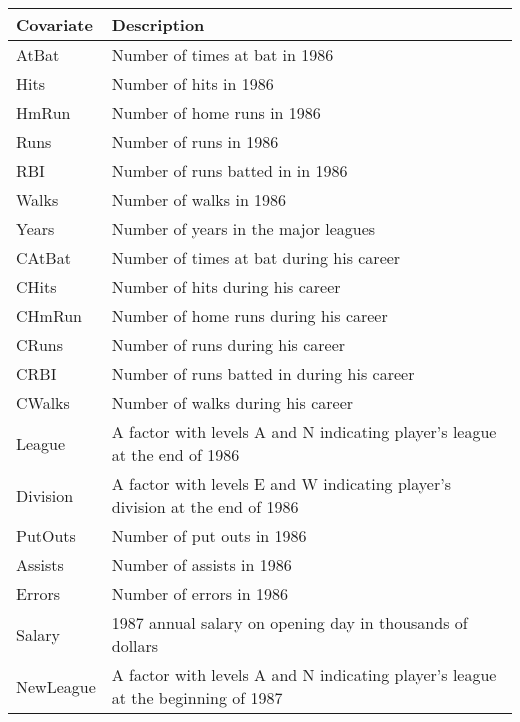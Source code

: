 \documentclass{amsart}[12pt]
\begin{document}
\begin{tabular}{|ll|}
	\hline
	Covariate & Description                                                                        \\
	\hline
	AtBat     & Number of times at bat in 1986                                                     \\
	Hits      & Number of hits in 1986                                                             \\
	HmRun     & Number of home runs in 1986                                                        \\
	Runs      & Number of runs in 1986                                                             \\
	RBI       & Number of runs batted in in 1986                                                   \\
	Walks     & Number of walks in 1986                                                            \\
	Years     & Number of years in the major leagues                                               \\
	CAtBat    & Number of times at bat during his career                                           \\
	CHits     & Number of hits during his career                                                   \\
	CHmRun    & Number of home runs during his career                                              \\
	CRuns     & Number of runs during his career                                                   \\
	CRBI      & Number of runs batted in during his career                                         \\
	CWalks    & Number of walks during his career                                                  \\
	League    & A factor with levels A and N indicating player’s league at the end of 1986       \\
	Division  & A factor with levels E and W indicating player’s division at the end of 1986     \\
	PutOuts   & Number of put outs in 1986                                                         \\
	Assists   & Number of assists in 1986                                                          \\
	Errors    & Number of errors in 1986                                                           \\
	Salary    & 1987 annual salary on opening day in thousands of dollars                          \\
	NewLeague & A factor with levels A and N indicating player’s league at the beginning of 1987 \\
	\hline
\end{tabular}
\end{document}
